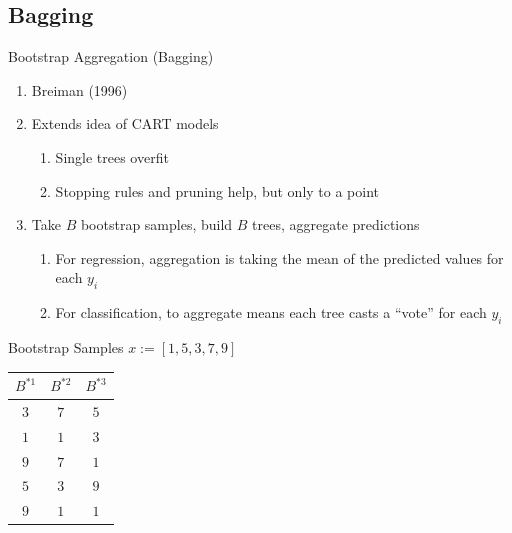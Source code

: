 \documentclass[pdf]{beamer}
\begin{document}
	\subsection{Bagging}
		\begin{frame}{Bootstrap Aggregation (Bagging)}
			\begin{enumerate}
				\item Breiman (1996)
				\item Extends idea of CART models
					\begin{enumerate}[1]
						\item Single trees overfit
						\item Stopping rules and pruning help, but only to a point
					\end{enumerate}
				\item Take $B$ bootstrap samples, build $B$ trees, aggregate predictions
					\begin{enumerate}[1]
						\item For regression, aggregation is taking the mean of the predicted values for each $y_i$
						\item For classification, to aggregate means each tree casts a ``vote'' for each $y_i$
					\end{enumerate}
			\end{enumerate}
    		\end{frame}
	
		\begin{frame}{Bootstrap Samples}
		$x := [1, 5, 3, 7, 9]$
		\begin{table}
		\begin{tabular}{c c c}
			\hline
			$B^{*1}$	& $B^{*2}$& $B^{*3}$  \\
			\hline
			$3$ 	& $7$ 	& $5$  \\
			$1$ 	& $1$ 	& $3$ \\
			$9$	& $7$	& $1$ \\
			$5$ 	& $3$ 	& $9$ \\
			$9$	& $1$	& $1$ \\
			\hline
		\end{tabular}
		\end{table}
		\end{frame}
		
\end{document}
